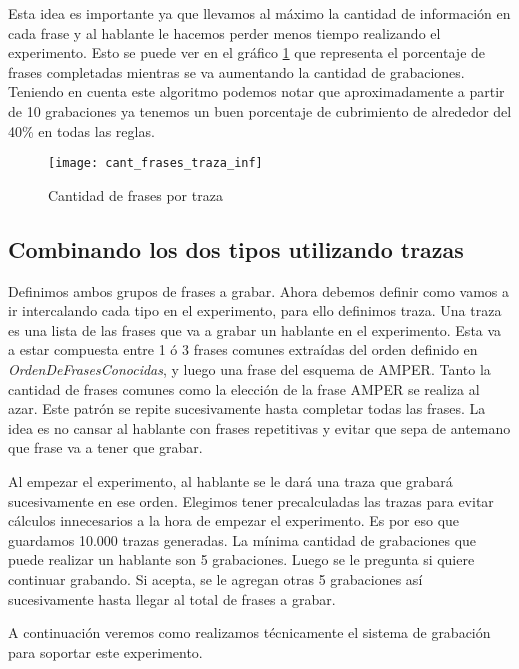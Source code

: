Esta idea es importante ya que llevamos al máximo la cantidad de información en cada frase y al hablante le hacemos perder menos tiempo realizando el experimento. Esto se puede ver en el gráfico \ref{figFracesTraza} que representa el porcentaje de frases completadas mientras se va aumentando la cantidad de grabaciones. Teniendo en cuenta este algoritmo podemos notar que aproximadamente a partir de 10 grabaciones ya tenemos un buen porcentaje de cubrimiento de alrededor del 40\% en todas las reglas.

\begin{figure}[h!]
    \centerline{\texttt{[image: cant\_frases\_traza\_inf]} }
    \caption{Cantidad de frases por traza}
    \label{figFracesTraza}
\end{figure}

\subsection{Combinando los dos tipos utilizando trazas}

Definimos ambos grupos de frases a grabar. Ahora debemos definir como vamos a ir intercalando cada tipo en el experimento, para ello definimos traza. Una traza es una lista de las frases que va a grabar un hablante en el experimento. Esta va a estar compuesta entre 1 ó 3 frases comunes extraídas del orden definido en \textit{OrdenDeFrasesConocidas}, y luego una frase del esquema de AMPER. Tanto la cantidad de frases comunes como la elección de la frase AMPER se realiza al azar. Este patrón se repite sucesivamente hasta completar todas las frases. La idea es no cansar al hablante con frases repetitivas y evitar que sepa de antemano que frase va a tener que grabar. 

Al empezar el experimento, al hablante se le dará una traza que grabará sucesivamente en ese orden. Elegimos tener precalculadas las trazas para evitar cálculos innecesarios a la hora de empezar el experimento. Es por eso que guardamos 10.000 trazas generadas. La mínima cantidad de grabaciones que puede realizar un hablante son 5 grabaciones. Luego se le pregunta si quiere continuar grabando. Si acepta, se le agregan otras 5 grabaciones así sucesivamente hasta llegar al total de frases a grabar.

A continuación veremos como realizamos técnicamente el sistema de grabación para soportar este experimento.